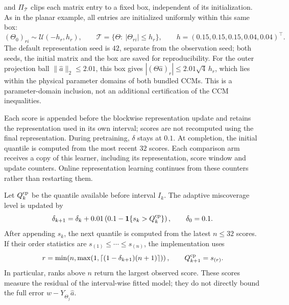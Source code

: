 \documentclass[11pt]{article}
\begin{document}
and $\Pi_{\mathcal T}$ clips each matrix entry to a fixed box, independent
of its initialization. As in the planar example, all entries are initialized
uniformly within this same box:
\begin{equation}
    (\Theta_0)_{ri}\sim\mathcal U(-h_r,h_r),\qquad
    \mathcal T=\{\Theta:\ |\Theta_{ri}|\le h_r\},\qquad
    h=(0.15,0.15,0.15,0.04,0.04)^\top.
\end{equation}
The default representation seed is $42$, separate from the observation seed;
both seeds, the initial matrix and the box are saved for reproducibility.
For the outer projection ball $\|\hat a\|_2\le2.01$, this box gives
$|(\Theta\hat a)_r|\le2.01\sqrt4\,h_r$, which lies within the physical
parameter domains of both bundled CCMs. This is a parameter-domain inclusion,
not an additional certification of the CCM inequalities.

Each score is appended before the blockwise representation update and retains
the representation used in its own interval; scores are not recomputed using
the final representation. During pretraining, $\delta$ stays at $0.1$.
At completion, the initial quantile is computed from the most recent $32$
scores. Each comparison arm receives a copy of this learner, including its
representation, score window and update counters. Online representation
learning continues from these counters rather than restarting them.

Let $Q_k^{\rm cp}$ be the quantile available before interval $I_k$.
The adaptive miscoverage level is updated by
\begin{equation}
    \delta_{k+1}=\delta_k+0.01
       \left(0.1-\mathbf1\{s_k>Q_k^{\rm cp}\}\right),
       \qquad\delta_0=0.1.
\end{equation}
After appending $s_k$, the next quantile is computed from the latest
$n\le32$ scores. If their order statistics are
$s_{(1)}\le\cdots\le s_{(n)}$, the implementation uses
\begin{equation}
    r=\min\!\left(n,\max\!\left(1,
       \left\lceil(1-\delta_{k+1})(n+1)\right\rceil\right)\right),
       \qquad Q_{k+1}^{\rm cp}=s_{(r)}.
\end{equation}
In particular, ranks above $n$ return the largest observed score.
These scores measure the residual of the interval-wise fitted model;
they do not directly bound the full error $w-Y_{\hat\Theta_j}\hat a$.
\end{document}
